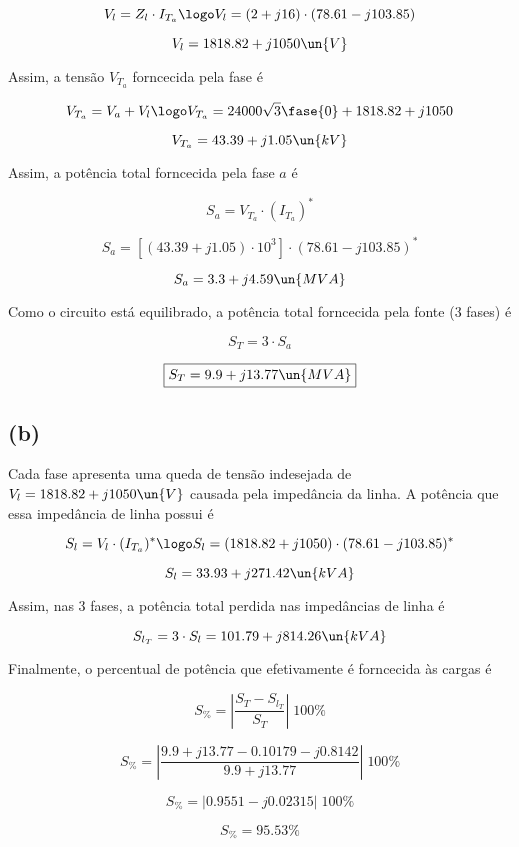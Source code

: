 \[ V_l = Z_l \cdot I_{T_a} \logo V_l =  (2 + j16) \cdot (78.61 - j103.85) \]

\[ V_l = 1818.82 + j1050 \un{V} \]

Assim, a tensão $V_{T_a}$ forncecida pela fase é  

\[ V_{T_a} = V_a + V_l \logo V_{T_a} = 24000\sqrt{3}\fase{0} + 1818.82 + j1050  \]

\[ V_{T_a} = 43.39 + j1.05 \un{kV} \]

Assim, a potência total forncecida pela fase $a$ é  

\[ S_a = V_{T_a} \cdot (I_{T_a})^* \]

\[ S_a = [(43.39 + j1.05)\cdot 10^3] \cdot (78.61 - j103.85)^* \]

\[ S_a = 3.3 + j4.59 \un{MVA} \]

Como o circuito está equilibrado, a potência total forncecida pela fonte (3 fases) é 

\[ S_T = 3 \cdot S_a  \]

\[ \boxed{S_T = 9.9 + j13.77 \un{MVA}} \]


\subsection*{(b)} 

Cada fase apresenta uma queda de tensão indesejada de $V_l = 1818.82 + j1050 \un{V}$ causada pela impedância da linha.
A potência que essa impedância de linha possui é 

\[ S_l = V_l \cdot (I_{T_a})^* \logo S_l = (1818.82 + j1050) \cdot (78.61 - j103.85)^* \]

\[ S_l = 33.93 + j271.42 \un{kVA} \]

Assim, nas 3 fases, a potência total perdida nas impedâncias de linha é  

\[ S_{l_T} = 3 \cdot S_l = 101.79 + j814.26 \un{kVA} \]

Finalmente, o percentual de potência que efetivamente é forncecida às cargas é

\[ S_{\%} = \left|\frac{S_T - S_{l_T}}{S_T}\right|\;100\% \]

\[ S_{\%} = \left|\frac{9.9 + j13.77 - 0.10179 - j0.8142}{9.9 + j13.77}\right|\;100\% \]

\[ S_{\%} = |0.9551 - j0.02315|\;100\% \]

\[ \boxed{S_{\%} = 95.53\%} \]
















